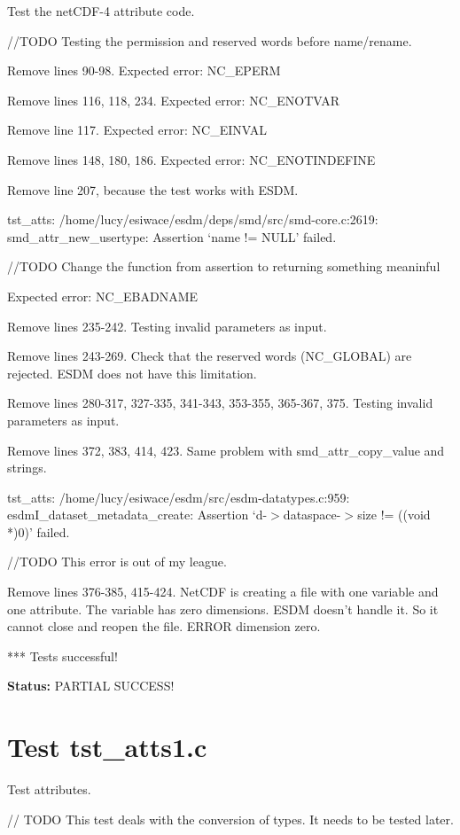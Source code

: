 Test the netCDF-4 attribute code.

//TODO Testing the permission and reserved words before name/rename.

Remove lines 90-98. Expected error: NC\_EPERM

Remove lines 116, 118, 234. Expected error: NC\_ENOTVAR

Remove line 117. Expected error: NC\_EINVAL

Remove lines 148, 180, 186. Expected error: NC\_ENOTINDEFINE

Remove line 207, because the test works with ESDM.

tst\_atts: /home/lucy/esiwace/esdm/deps/smd/src/smd-core.c:2619: smd\_attr\_new\_usertype: Assertion `name != NULL' failed.

//TODO Change the function from assertion to returning something meaninful

Expected error: NC\_EBADNAME

Remove lines 235-242. Testing invalid parameters as input.

Remove lines 243-269. Check that the reserved words (NC\_GLOBAL) are rejected. ESDM does not have this limitation.

Remove lines 280-317, 327-335, 341-343, 353-355, 365-367, 375. Testing invalid parameters as input.

Remove lines 372, 383, 414, 423. Same problem with smd\_attr\_copy\_value and strings.

tst\_atts: /home/lucy/esiwace/esdm/src/esdm-datatypes.c:959: esdmI\_dataset\_metadata\_create: Assertion `d-$>$dataspace-$>$size != ((void *)0)' failed.

//TODO This error is out of my league.

Remove lines 376-385, 415-424. NetCDF is creating a file with one variable and one attribute. The variable has zero dimensions. ESDM doesn't handle it. So it cannot close and reopen the file. ERROR dimension zero.

*** Tests successful!

{\bf \large Status: } PARTIAL SUCCESS!

\section{Test tst\_atts1.c}

Test attributes.

// TODO This test deals with the conversion of types. It needs to be tested later.

